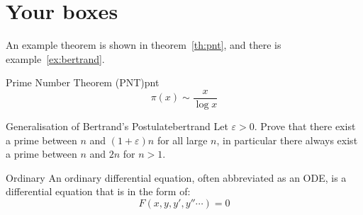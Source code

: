 \documentclass[]{article}
\begin{document}
\section{Your boxes}
An example theorem is shown in theorem~\ref{th:pnt}, and there is
example~\ref{ex:bertrand}.
\begin{Theorem}{Prime Number Theorem (PNT)}{pnt}
    \begin{equation*}
        \pi(x)\sim\frac{x}{\log x}
    \end{equation*}
\end{Theorem}

\begin{Example}{Generalisation of Bertrand's Postulate}{bertrand}
    Let $\varepsilon>0$. Prove that there exist a prime between $n$ and
    $(1+\varepsilon)n$ for all large $n$, in particular there always exist a
    prime between $n$ and $2n$ for $n>1$.
\end{Example}

\begin{Definition}{Ordinary}
    An ordinary differential equation, often abbreviated as an ODE, is a
    differential equation that is in the form of:
    \begin{equation*}
        F(x,y,y',y''\cdots)=0
    \end{equation*}
\end{Definition}
\end{document}
